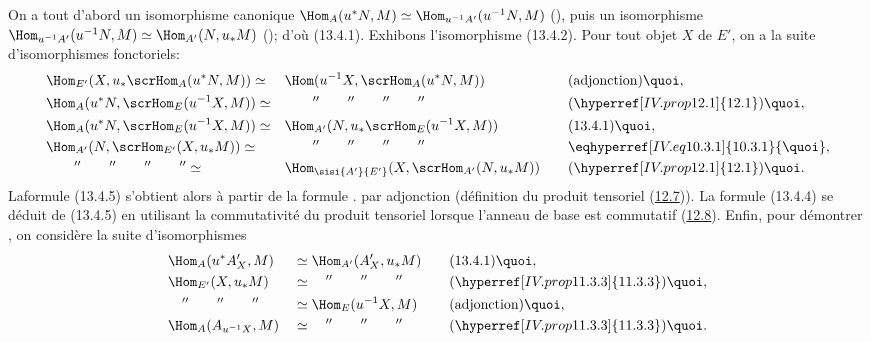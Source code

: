 \documentclass[10pt]{../fichiers-configuration-latex/smfart}
\begin{document}
On a tout d'abord un isomorphisme canonique
$\Hom_A(u^{\ast}N,M)\simeq \Hom_{u^{-1}A'}(u^{-1}N,M)$
(), puis un isomorphisme
$\Hom_{u^{-1}A'}(u^{-1}N,M)\simeq \Hom_{A'}(N,u_{\ast}M)$
(); d'où (13.4.1). Exhibons l'isomorphisme
(13.4.2). Pour tout objet $X$ de $E'$, on a la suite
d'isomorphismes fonctoriels:
\begin{alignat*}{3}
& \Hom_{E'}(X,u_{\ast}\scrHom_A (u^{\ast}N,M))\simeq && \Hom(
u^{-1}X,
 \scrHom_A (u^{\ast}N, M)) &\quad& \text{(adjonction){\quoi},}\\
&\Hom_A(u^{\ast}N,\scrHom_E (u^{-1}X, M)) \simeq &&\qquad ''\qquad ''\qquad
''\qquad '' && (\hyperref[IV.prop12.1]{12.1}){\quoi},\\
& \Hom_A (u^{\ast}N,\scrHom_E(u^{-1}X, M))\simeq &&\Hom_{A'}(N,
u_{\ast} \scrHom_E (u^{-1} X, M)) && (13.4.1){\quoi},\\
& \Hom_{A'}(N,\scrHom_{E'}(X,u_{\ast}M))\simeq &&\qquad ''\qquad  ''\qquad
 ''\qquad '' && \eqhyperref[IV.eq10.3.1]{10.3.1}{\quoi},\\
& \qquad ''\qquad ''\qquad ''\qquad '' \simeq &&
 \Hom_{\sisi{A'}{E'}}(X,\scrHom_{A'}(N,u_{\ast}M)) && (\hyperref[IV.prop12.1]{12.1}){\quoi}.
\end{alignat*}
La\pageoriginale formule (13.4.5) s'obtient alors à partir de
la formule . par adjonction (définition du produit tensoriel
(\hyperref[IV.prop12.7]{12.7})). La formule (13.4.4) se déduit de
(13.4.5) en utilisant la commutativité du produit tensoriel
lorsque l'anneau de base est commutatif (\hyperref[IV.subsec12.8]{12.8}).
Enfin, pour démontrer , on considère la suite
d'isomorphismes
\begin{alignat*}{3}
& \Hom_A(u^{\ast}A'_X, M) && \simeq\Hom_{A'}(A'_X, u_{\ast}M)
&\quad&
(13.4.1){\quoi},\\
& \Hom_{E'}(X, u_{\ast}M) && \simeq\quad ''\qquad ''\qquad ''&&
(\hyperref[IV.prop11.3.3]{11.3.3}){\quoi},\\
&\quad ''\qquad ''\qquad ''&& \simeq\Hom_E(u^{-1}X, M) &&
\text{(adjonction)}{\quoi},\\
&\Hom_A(A_{u^{-1}X},M) &&\simeq\quad ''\qquad ''\qquad ''&&
(\hyperref[IV.prop11.3.3]{11.3.3}){\quoi}.
\end{alignat*}
\end{document}
